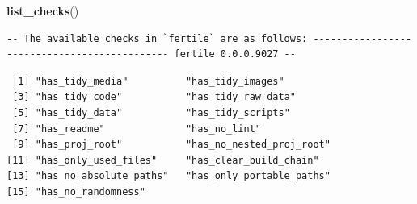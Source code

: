 \documentclass[12pt,twoside]{reedthesis}
\newenvironment{Shaded}{\begin{snugshade}}{\end{snugshade}}
\newcommand{\KeywordTok}[1]{\textcolor[rgb]{0.13,0.29,0.53}{\textbf{#1}}}
\newcommand{\NormalTok}[1]{#1}
\begin{document}
\footnotesize
\begin{Shaded}
\begin{Highlighting}[]
\KeywordTok{list_checks}\NormalTok{()}
\end{Highlighting}
\end{Shaded}
\begin{verbatim}
-- The available checks in `fertile` are as follows: --------------------------------------------- fertile 0.0.0.9027 --
\end{verbatim}
\begin{verbatim}
 [1] "has_tidy_media"          "has_tidy_images"        
 [3] "has_tidy_code"           "has_tidy_raw_data"      
 [5] "has_tidy_data"           "has_tidy_scripts"       
 [7] "has_readme"              "has_no_lint"            
 [9] "has_proj_root"           "has_no_nested_proj_root"
[11] "has_only_used_files"     "has_clear_build_chain"  
[13] "has_no_absolute_paths"   "has_only_portable_paths"
[15] "has_no_randomness"      
\end{verbatim}
\normalsize
\end{document}
